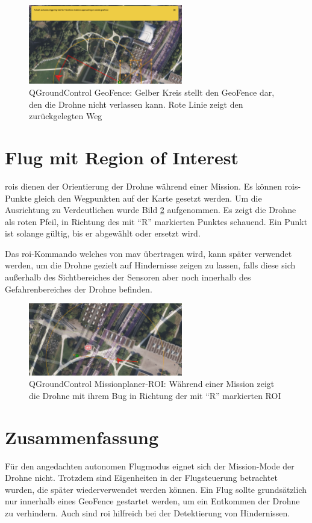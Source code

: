 \begin{figure}[h]
    \centering
    \includegraphics[width=0.6\textwidth]{images/mission_geofence.png}
    \caption[QGroundControl GeoFence]{QGroundControl GeoFence: Gelber Kreis stellt den GeoFence dar, den die Drohne nicht verlassen kann. Rote Linie zeigt den zurückgelegten Weg}
    \label{fig:qgc_mission_geofence}
\end{figure}

\section{Flug mit Region of Interest}
\glspl{roi} dienen der Orientierung der Drohne während einer Mission. Es können \glspl{roi}-Punkte gleich den Wegpunkten auf der Karte gesetzt werden. Um die Ausrichtung zu Verdeutlichen wurde Bild \ref{fig:qgc_mission_roi} aufgenommen. Es zeigt die Drohne als roten Pfeil, in Richtung des mit \enquote{R} markierten Punktes schauend. Ein Punkt ist solange gültig, bis er abgewählt oder ersetzt wird.

Das \gls{roi}-Kommando welches von \acrshort{mav} übertragen wird, kann später verwendet werden, um die Drohne gezielt auf Hindernisse zeigen zu lassen, falls diese sich außerhalb des Sichtbereiches der Sensoren aber noch innerhalb des Gefahrenbereiches der Drohne befinden.

\begin{figure}[h]
    \centering
    \includegraphics[width=0.6\textwidth]{images/mission_roi.png}
    \caption[QGroundControl Missionplaner-ROI]{QGroundControl Missionplaner-ROI: Während einer Mission zeigt die Drohne mit ihrem Bug in Richtung der mit \enquote{R} markierten ROI}
    \label{fig:qgc_mission_roi}
\end{figure}

\section{Zusammenfassung}
Für den angedachten autonomen Flugmodus eignet sich der Mission-Mode der Drohne nicht. Trotzdem sind Eigenheiten in der Flugsteuerung betrachtet wurden, die später wiederverwendet werden können. Ein Flug sollte grundsätzlich nur innerhalb eines GeoFence gestartet werden, um ein Entkommen der Drohne zu verhindern. Auch sind \acrshort{roi} hilfreich bei der Detektierung von Hindernissen. 
